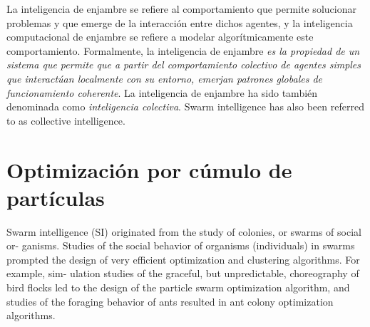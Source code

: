 \documentclass{article}
\begin{document}
La inteligencia de enjambre se refiere al comportamiento que permite solucionar problemas y que emerge de la interacción entre dichos agentes, y la inteligencia computacional de enjambre se refiere a modelar algorítmicamente este comportamiento.
Formalmente, la inteligencia de enjambre \emph{es la propiedad de un sistema que permite que a partir del comportamiento colectivo de agentes simples que interactúan localmente con su entorno, emerjan patrones globales de funcionamiento coherente}.
La inteligencia de enjambre ha sido también denominada como \emph{inteligencia colectiva}.
Swarm intelligence has also been referred to as collective intelligence.




\section{Optimización por cúmulo de partículas}
Swarm intelligence (SI) originated from the study of colonies, or swarms of social or-
ganisms. Studies of the social behavior of organisms (individuals) in swarms prompted
the design of very efficient optimization and clustering algorithms. For example, sim-
ulation studies of the graceful, but unpredictable, choreography of bird flocks led to
the design of the particle swarm optimization algorithm, and studies of the foraging
behavior of ants resulted in ant colony optimization algorithms.
\end{document}
